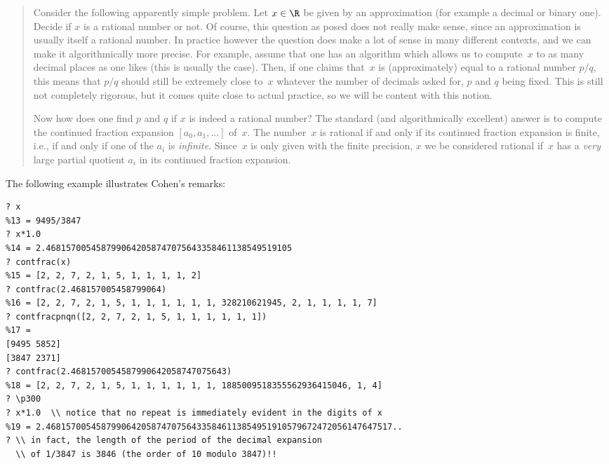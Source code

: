 \documentclass[11pt]{report}
\begin{document}
\begin{quote}
  Consider the following apparently simple problem.  Let $x\in\R$ be
  given by an approximation (for example a decimal or binary one).
  Decide if $x$ is a rational number or not.  Of course, this question
  as posed does not really make sense, since an approximation is usually
  itself a rational number.  In practice however the question does make
  a lot of sense in many different contexts, and we can make it
  algorithmically more precise.  For example, assume that one has an
  algorithm which allows us to compute~$x$ to as many decimal places as
  one likes (this is usually the case).  Then, if one claims that~$x$ is
  (approximately) equal to a rational number $p/q$, this means that
  $p/q$ should still be extremely close to~$x$ whatever the number of
  decimals asked for, $p$ and $q$ being fixed.  This is still not
  completely rigorous, but it comes quite close to actual practice, so
  we will be content with this notion.

  Now how does one find $p$ and $q$ if $x$ is indeed a rational number?
  The standard (and algorithmically excellent) answer is to compute the
  continued fraction expansion $[a_0, a_1, \ldots ]$ of~$x$.
  The number~$x$ is rational if and only if its continued fraction expansion
  is finite, i.e., if and only if one of the $a_i$ is {\em infinite}.
  Since~$x$ is only given with the finite precision, $x$ we be considered
  rational if~$x$ has a {\em very} large partial quotient $a_i$ in its
  continued fraction expansion.
\end{quote}

The following example illustrates Cohen's remarks:
\begin{example}
  \begin{verbatim}
? x
%13 = 9495/3847
? x*1.0
%14 = 2.4681570054587990642058747075643358461138549519105
? contfrac(x)
%15 = [2, 2, 7, 2, 1, 5, 1, 1, 1, 1, 2]
? contfrac(2.468157005458799064)
%16 = [2, 2, 7, 2, 1, 5, 1, 1, 1, 1, 1, 1, 328210621945, 2, 1, 1, 1, 1, 7]
? contfracpnqn([2, 2, 7, 2, 1, 5, 1, 1, 1, 1, 1, 1])
%17 =
[9495 5852]
[3847 2371]
? contfrac(2.4681570054587990642058747075643)
%18 = [2, 2, 7, 2, 1, 5, 1, 1, 1, 1, 1, 1, 1885009518355562936415046, 1, 4]
? \p300
? x*1.0  \\ notice that no repeat is immediately evident in the digits of x
%19 = 2.468157005458799064205874707564335846113854951910579672472056147647517..
? \\ in fact, the length of the period of the decimal expansion 
  \\ of 1/3847 is 3846 (the order of 10 modulo 3847)!!
\end{verbatim}

\end{example}
\end{document}
